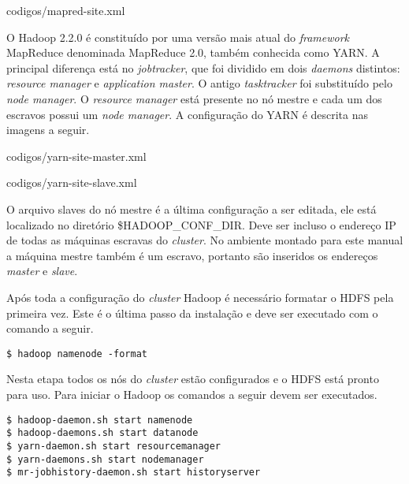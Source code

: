 \begin{apendicesenv}

		{codigos/mapred-site.xml}

O Hadoop 2.2.0 é constituído por uma versão mais atual do \textit{framework} MapReduce denominada MapReduce 2.0, também conhecida como YARN. A principal diferença está no \textit{jobtracker}, que foi dividido em dois \textit{daemons} distintos: \textit{resource manager} e \textit{application master}. O antigo \textit{tasktracker} foi substituído pelo \textit{node manager}. O \textit{resource manager} está presente no nó mestre e cada um dos escravos possui um \textit{node manager}. A configuração do YARN é descrita nas imagens a seguir.

\newpage

		{codigos/yarn-site-master.xml}

\newpage

		{codigos/yarn-site-slave.xml}


O arquivo slaves do nó mestre é a última configuração a ser editada, ele está localizado no diretório \$HADOOP\_CONF\_DIR. Deve ser incluso o endereço IP de todas as máquinas escravas do \textit{cluster}. No ambiente montado para este manual a máquina mestre também é um escravo, portanto são inseridos os endereços \textit{master} e \textit{slave}.

Após toda a configuração do \textit{cluster} Hadoop é necessário formatar o HDFS pela primeira vez. Este é o última passo da instalação e deve ser executado com o comando a seguir.

\begin{lstlisting}[style=abnt,frame=single]
$ hadoop namenode -format
\end{lstlisting}

Nesta etapa todos os nós do \textit{cluster} estão configurados e o HDFS está pronto para uso. Para iniciar o Hadoop os comandos a seguir devem ser executados.

\newpage
\begin{lstlisting}[style=abnt,frame=single]
$ hadoop-daemon.sh start namenode 
$ hadoop-daemons.sh start datanode 
$ yarn-daemon.sh start resourcemanager 
$ yarn-daemons.sh start nodemanager 
$ mr-jobhistory-daemon.sh start historyserver
\end{lstlisting}


\end{apendicesenv}
